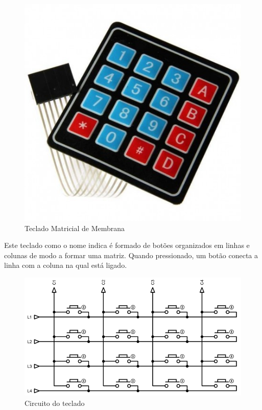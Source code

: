 \begin{figure}[htbp]
	\centering
	\includegraphics[scale=0.3]{figuras/teclado-matricial.jpg}
	\caption{Teclado Matricial de Membrana}
	\label{teclado}
\end{figure}

Este teclado como o nome indica é formado de botões organizados em linhas e colunas de modo a formar uma matriz. Quando pressionado, um botão conecta a linha com a coluna na qual está ligado. 

\begin{figure}[htbp]
	\centering
	\includegraphics[scale=0.4]{figuras/matrix-1024x558.png}
	\caption{Circuito do teclado}
	\label{teclado-conexoes}
\end{figure}

